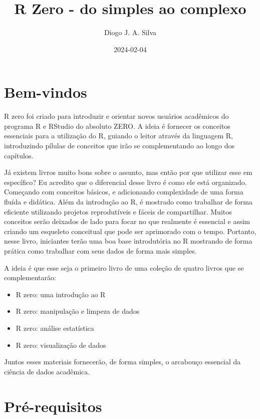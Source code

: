 \documentclass[
]{book}
\title{R Zero - do simples ao complexo}
\author{Diogo J. A. Silva}
\date{2024-02-04}
\providecommand{\tightlist}{%
  \setlength{\itemsep}{0pt}\setlength{\parskip}{0pt}}
\begin{document}
\maketitle

{
\setcounter{tocdepth}{1}
\tableofcontents
}
\hypertarget{bem-vindos}{%
\chapter{Bem-vindos}\label{bem-vindos}}

R zero foi criado para introduzir e orientar novos usuários acadêmicos do programa R e RStudio do absoluto ZERO. A ideia é fornecer os conceitos essenciais para a utilização do R, guiando o leitor através da linguagem R, introduzindo pílulas de conceitos que irão se complementando ao longo dos capítulos.

Já existem livros muito bons sobre o assunto, mas então por que utilizar esse em específico? Eu acredito que o diferencial desse livro é como ele está organizado. Começando com conceitos básicos, e adicionando complexidade de uma forma fluída e didática. Além da introdução ao R, é mostrado como trabalhar de forma eficiente utilizando projetos reprodutíveis e fáceis de compartilhar. Muitos conceitos serão deixados de lado para focar no que realmente é essencial e assim criando um esqueleto conceitual que pode ser aprimorado com o tempo. Portanto, nesse livro, iniciantes terão uma boa base introdutória no R mostrando de forma prática como trabalhar com seus dados de forma mais simples.

A ideia é que esse seja o primeiro livro de uma coleção de quatro livros que se complementarão:

\begin{itemize}
\tightlist
\item
  R zero: uma introdução ao R
\item
  R zero: manipulação e limpeza de dados
\item
  R zero: análise estatística
\item
  R zero: visualização de dados
\end{itemize}

Juntos esses materiais fornecerão, de forma simples, o arcabouço essencial da ciência de dados acadêmica.

\hypertarget{pruxe9-requisitos}{%
\chapter{Pré-requisitos}\label{pruxe9-requisitos}}
\end{document}
